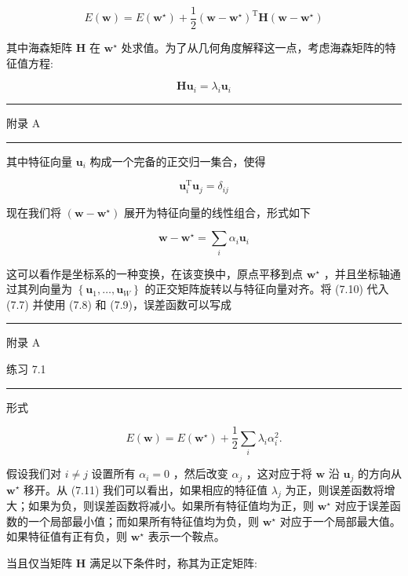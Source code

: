 \documentclass[10pt]{report}
\newcommand{\HRule}{\begin{center}\rule{0.9\linewidth}{0.2mm}\end{center}}
\begin{document}
\[
E\left( \mathbf{w}\right)  = E\left( {\mathbf{w}}^{ \star  }\right)  + \frac{1}{2}{\left( \mathbf{w} - {\mathbf{w}}^{ \star  }\right) }^{\mathrm{T}}\mathbf{H}\left( {\mathbf{w} - {\mathbf{w}}^{ \star  }}\right)  \tag{7.7}
\]

其中海森矩阵 \(\mathbf{H}\) 在 \({\mathbf{w}}^{ \star  }\) 处求值。为了从几何角度解释这一点，考虑海森矩阵的特征值方程:

\[
\mathbf{H}{\mathbf{u}}_{i} = {\lambda }_{i}{\mathbf{u}}_{i} \tag{7.8}
\]

\HRule

附录 A

\HRule

其中特征向量 \({\mathbf{u}}_{i}\) 构成一个完备的正交归一集合，使得

\[
{\mathbf{u}}_{i}^{\mathrm{T}}{\mathbf{u}}_{j} = {\delta }_{ij} \tag{7.9}
\]

现在我们将 \(\left( {\mathbf{w} - {\mathbf{w}}^{ \star  }}\right)\) 展开为特征向量的线性组合，形式如下

\[
\mathbf{w} - {\mathbf{w}}^{ \star  } = \mathop{\sum }\limits_{i}{\alpha }_{i}{\mathbf{u}}_{i} \tag{7.10}
\]

这可以看作是坐标系的一种变换，在该变换中，原点平移到点 \({\mathbf{w}}^{ \star  }\) ，并且坐标轴通过其列向量为 \(\left\{  {{\mathbf{u}}_{1},\ldots ,{\mathbf{u}}_{W}}\right\}\) 的正交矩阵旋转以与特征向量对齐。将 (7.10) 代入 (7.7) 并使用 (7.8) 和 (7.9)，误差函数可以写成

\HRule

附录 A

练习 7.1

\HRule

形式

\[
E\left( \mathbf{w}\right)  = E\left( {\mathbf{w}}^{ \star  }\right)  + \frac{1}{2}\mathop{\sum }\limits_{i}{\lambda }_{i}{\alpha }_{i}^{2}. \tag{7.11}
\]

假设我们对 \(i \neq  j\) 设置所有 \({\alpha }_{i} = 0\) ，然后改变 \({\alpha }_{j}\) ，这对应于将 \(\mathbf{w}\) 沿 \({\mathbf{u}}_{j}\) 的方向从 \({\mathbf{w}}^{ \star  }\) 移开。从 (7.11) 我们可以看出，如果相应的特征值 \({\lambda }_{j}\) 为正，则误差函数将增大；如果为负，则误差函数将减小。如果所有特征值均为正，则 \({\mathbf{w}}^{ \star  }\) 对应于误差函数的一个局部最小值；而如果所有特征值均为负，则 \({\mathbf{w}}^{ \star  }\) 对应于一个局部最大值。如果特征值有正有负，则 \({\mathbf{w}}^{ \star  }\) 表示一个鞍点。

当且仅当矩阵 \(\mathbf{H}\) 满足以下条件时，称其为正定矩阵:
\end{document}

